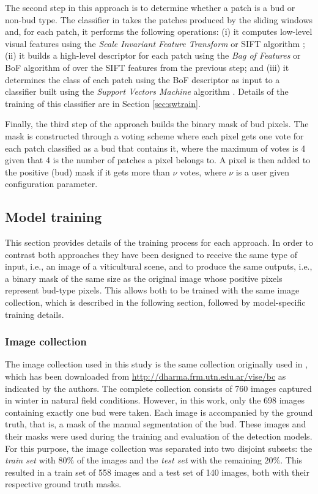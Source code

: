 \documentclass[a4paper,authoryear,review]{elsarticle}
\begin{document}
The second step in this approach is to determine whether a patch is a bud or non-bud type. The classifier in  \citet{perez2017image} takes the patches produced by the sliding windows and, for each patch, it performs the following operations: (i) it computes low-level visual features using the \emph{Scale Invariant Feature Transform} or SIFT algorithm \citep{lowe2004distinctive}; (ii) it builds a high-level descriptor for each patch using the \emph{Bag of Features} or BoF algorithm of \citet{csurka2004visual} over  the SIFT features from the previous step; and (iii) it determines the class of each patch using the BoF descriptor as input to a  classifier built using the \emph{Support Vectors Machine} algorithm \citep{vapnik2013nature}. Details of the training of this classifier are in Section \ref{sec:swtrain}.

Finally, the third step of the approach builds the binary mask of bud pixels. The mask is constructed through a voting scheme where each pixel gets one vote for each patch classified as a bud that contains it, where the maximum of votes is 4 given that 4 is the number of patches a pixel belongs to. A pixel is then added to the positive (bud) mask if it gets more than $\nu$ votes, where $\nu$ is a user given configuration parameter.

\subsection{Model training}
\label{sec:train}

This section provides details of the training process for each approach. In order to contrast both approaches they have been designed to receive the same type of input, i.e., an image of a viticultural scene, and to produce the same outputs, i.e., a binary mask of the same size as the original image whose positive pixels represent bud-type pixels. This allows both to be trained with the same image collection, which is described in the following section, followed by model-specific training details.

\subsubsection{Image collection}
\label{sec:collection}

The image collection used in this study is the same collection originally used in \citet{perez2017image}, which has been downloaded from \url{
http://dharma.frm.utn.edu.ar/vise/bc} as indicated by the authors. The complete collection consists of 760 images captured in winter in natural field conditions. However, in this work, only the 698 images containing exactly one bud were taken. Each image is accompanied by the ground truth, that is, a mask of the  manual segmentation of the bud. These images and their masks were used during the training and evaluation of the detection models. For this purpose, the image collection was separated into two disjoint subsets: the \emph{train set} with $80\%$ of the images and the \emph{test set} with the remaining  $20\%$. This resulted in a train set of 558 images and a test set of 140 images, both with their respective ground truth masks.
\end{document}
